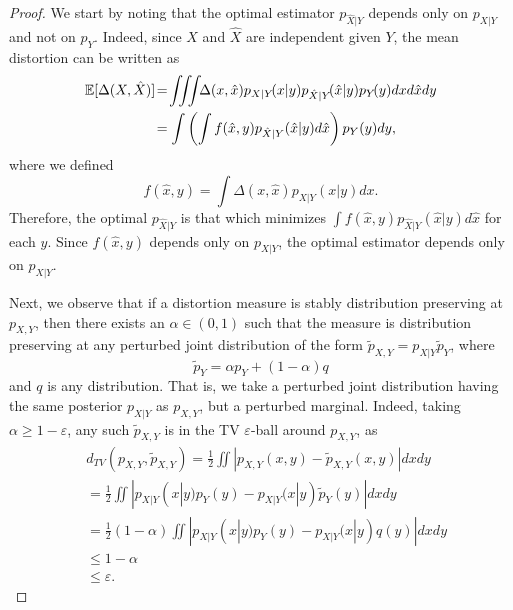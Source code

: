 \begin{proof}
We start by noting that the optimal estimator $p_{\hat{X}|Y}$ depends only on $p_{X|Y}$ and not on $p_Y$. Indeed, since $X$ and $\hat{X}$ are independent given $Y$, the mean distortion can be written as
\begin{align}\label{eq:meanDistortionExplicit}
\mathbb{E}[\Delta(X,\hat{X})]\! &=\!\iiint \!\!\Delta(x,\hat{x}) p_{X|Y}\!(x|y)p_{\hat{X}|Y}\!(\hat{x}|y)p_Y\!(y) dx d\hat{x} dy \nonumber\\
&= \int \left(\int f(\hat{x},y) p_{\hat{X}|Y}(\hat{x}|y) d\hat{x} \right) p_Y(y) dy,
\end{align}
where we defined
\begin{equation}\label{eq:definef}
f(\hat{x},y) = \int \Delta(x,\hat{x}) p_{X|Y}(x|y)dx.
\end{equation}
Therefore, the optimal $p_{\hat{X}|Y}$ is that which minimizes $\int f(\hat{x},y) p_{\hat{X}|Y}(\hat{x}|y) d\hat{x}$ for each $y$. Since $f(\hat{x},y)$ depends only on $p_{X|Y}$,
the optimal estimator depends only on $p_{X|Y}$.

Next, we observe that if a distortion measure is stably distribution preserving at $p_{X,Y}$, then there exists an $\alpha\in(0,1)$ such that the measure is distribution preserving at any perturbed joint distribution of the form $\tilde{p}_{X,Y} = p_{X|Y} \tilde{p}_Y $, where
\begin{equation}\label{eq:perturbedPy}
\tilde{p}_Y = \alpha p_Y + (1-\alpha) q
\end{equation}
and $q$ is any distribution. 
That is, we take a perturbed joint distribution having the same posterior $p_{X|Y}$ as $p_{X,Y}$, but a perturbed marginal. Indeed, taking $\alpha\geq 1-\varepsilon$, any such
$\tilde{p}_{X,Y}$ is in the TV $\varepsilon$-ball around $p_{X,Y}$, as
\begin{align}
    &d_{TV}(p_{X,Y}, \tilde{p}_{X,Y}) = \tfrac{1}{2} \iint |p_{X,Y}(x,y) - \tilde{p}_{X,Y}(x,y)| dx dy \nonumber \\ 
    &= \tfrac{1}{2} \iint | p_{X|Y}(x|y)p_Y(y) - p_{X|Y}(x|y)\tilde{p}_Y(y)| dx dy \nonumber \\
    &= \tfrac{1}{2} (1-\alpha) \iint | p_{X|Y}(x|y)p_Y(y) - p_{X|Y}(x|y)q(y)| dx dy \nonumber \\
    & \le 1-\alpha \nonumber\\
    & \le \varepsilon.
\end{align}


\end{proof}
